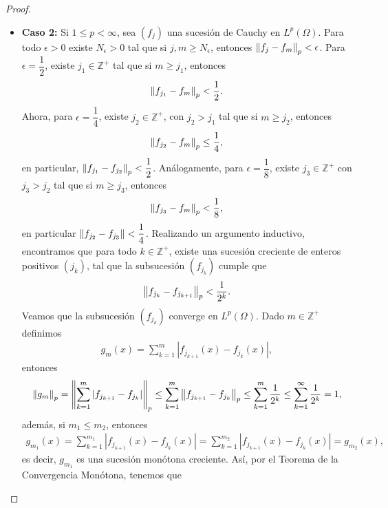 \begin{proof}
\begin{itemize}
        \item \textbf{Caso 2:} Si $1\leq p<\infty$, sea $(f_j)$ una sucesión de Cauchy en $L^p(\Omega)$. Para todo $\epsilon>0$ existe $N_\epsilon>0$ tal que si $j,m\geq N_\epsilon$, entonces $\left\|f_j-f_m\right\|_p<\epsilon$. Para $\epsilon=\dfrac{1}{2}$, existe $j_1\in \mathbb{Z}^+$ tal que si $m\geq j_1$, entonces
        \begin{align*}
            \left\|f_{j_1}-f_m\right\|_p<\dfrac{1}{2}.
        \end{align*}
        Ahora, para $\epsilon=\dfrac{1}{4}$, existe $j_2\in \mathbb{Z}^+$, con $j_2>j_1$ tal que si $m\geq j_2$, entonces
        \begin{align*}
            \left\|f_{j_2}-f_m\right\|_p\leq \dfrac{1}{4},
        \end{align*}
        en particular, $\left\|f_{j_1}-f_{j_2}\right\|_p<\dfrac{1}{2}$. Análogamente, para $\epsilon=\dfrac{1}{8}$, existe $j_3\in \mathbb{Z}^+$ con $j_3>j_2$ tal que si $m\geq j_3$, entonces
        \begin{align*}
            \left\|f_{j_3}-f_m\right\|_p<\dfrac{1}{8},
        \end{align*}
        en particular $\left\|f_{j_2}-f_{j_3}\right\|<\dfrac{1}{4}$. Realizando un argumento inductivo, encontramos que para todo $k\in \mathbb{Z}^+$, existe una sucesión creciente de enteros positivos $(j_k)$, tal que la subsucesión $(f_{j_k})$ cumple que
        \begin{align*}
            \left\|f_{j_k}-f_{j_{k+1}}\right\|_p<\dfrac{1}{2^k}.
        \end{align*}
        Veamos que la subsucesión $(f_{j_k})$ converge en $L^p(\Omega)$. Dado $m \in \mathbb{Z}^+$ definimos
        \begin{align*}
            g_m(x)=\sum_{k=1}^m |f_{j_{k+1}}(x)-f_{j_k}(x)|,
        \end{align*}
        entonces
        \begin{align*}
            \left\|g_m\right\|_p=\left\|\sum_{k=1}^m |f_{j_{k+1}}-f_{j_k}|\right\|_p\leq \sum_{k=1}^m\left\|f_{j_{k+1}}-f_{j_k}\right\|_p\leq \sum_{k=1}^m\dfrac{1}{2^k}\leq \sum_{k=1}^\infty\dfrac{1}{2^k}=1,
        \end{align*}
        además, si $m_1\leq m_2$, entonces
        \begin{align*}
            g_{m_1}(x)=\sum_{k=1}^{m_1} |f_{j_{k+1}}(x)-f_{j_k}(x)|=\sum_{k=1}^{m_2} |f_{j_{k+1}}(x)-f_{j_k}(x)|=g_{m_2}(x),
        \end{align*}
        es decir, $g_{m_1}$ es una sucesión monótona creciente. Así, por el Teorema de la Convergencia Monótona, tenemos que 

\end{itemize}
\end{proof}
